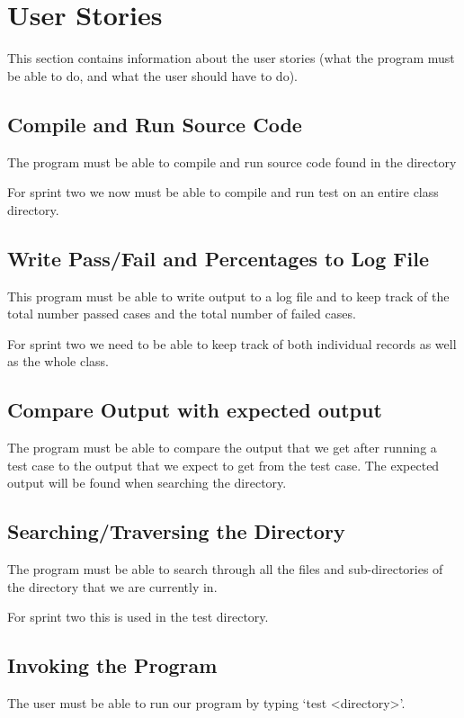 \section{User Stories}
This section contains information about the user stories (what the program must be able 
to do, and what the user should have to do).



\subsection{Compile and Run Source Code}
The program must be able to compile and run source code found in the directory

For sprint two we now must be able to compile and run test on an entire class directory.

\subsection{Write Pass/Fail and Percentages to Log File} 
This program must be able to write output to a log file and to keep track of the total number
passed cases and the total number of failed cases.

For sprint two we need to be able to keep track of both individual records as well as the whole class.

\subsection{Compare Output with expected output}
The program must be able to compare the output that we get after running a test case to the
output that we expect to get from the test case. The expected output will be found when 
searching the directory.

\subsection{Searching/Traversing the Directory}
The program must be able to search through all the files and sub-directories of the directory 
that we are currently in.

For sprint two this is used in the test directory.

\subsection{Invoking the Program}
The user must be able to run our program by typing `test <directory>'.


